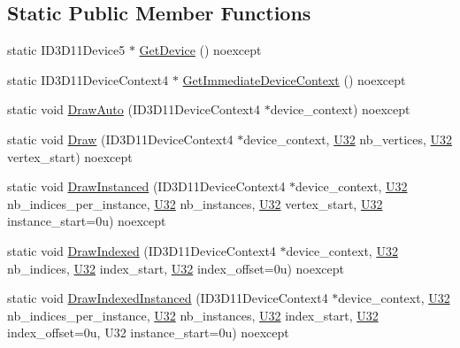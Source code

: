 \subsection*{Static Public Member Functions}
\begin{DoxyCompactItemize}
\item 
static I\+D3\+D11\+Device5 $\ast$ \hyperlink{structmage_1_1_pipeline_a106ef812d342b6f9afc52976eb67f136}{Get\+Device} () noexcept
\item 
static I\+D3\+D11\+Device\+Context4 $\ast$ \hyperlink{structmage_1_1_pipeline_a627116ca4b8d77277c5aae0b986eddeb}{Get\+Immediate\+Device\+Context} () noexcept
\item 
static void \hyperlink{structmage_1_1_pipeline_ae4c5c2f93213062df4ed5964182e06fe}{Draw\+Auto} (I\+D3\+D11\+Device\+Context4 $\ast$device\+\_\+context) noexcept
\item 
static void \hyperlink{structmage_1_1_pipeline_afbce120d43cbe47d1f69b2be40d1fd80}{Draw} (I\+D3\+D11\+Device\+Context4 $\ast$device\+\_\+context, \hyperlink{namespacemage_a41c104c036fba3756a74e19f793eeaa1}{U32} nb\+\_\+vertices, \hyperlink{namespacemage_a41c104c036fba3756a74e19f793eeaa1}{U32} vertex\+\_\+start) noexcept
\item 
static void \hyperlink{structmage_1_1_pipeline_a7a4006773adca9c29fdc3436280dd628}{Draw\+Instanced} (I\+D3\+D11\+Device\+Context4 $\ast$device\+\_\+context, \hyperlink{namespacemage_a41c104c036fba3756a74e19f793eeaa1}{U32} nb\+\_\+indices\+\_\+per\+\_\+instance, \hyperlink{namespacemage_a41c104c036fba3756a74e19f793eeaa1}{U32} nb\+\_\+instances, \hyperlink{namespacemage_a41c104c036fba3756a74e19f793eeaa1}{U32} vertex\+\_\+start, \hyperlink{namespacemage_a41c104c036fba3756a74e19f793eeaa1}{U32} instance\+\_\+start=0u) noexcept
\item 
static void \hyperlink{structmage_1_1_pipeline_acfb174bff4702075e1b4ea2111192616}{Draw\+Indexed} (I\+D3\+D11\+Device\+Context4 $\ast$device\+\_\+context, \hyperlink{namespacemage_a41c104c036fba3756a74e19f793eeaa1}{U32} nb\+\_\+indices, \hyperlink{namespacemage_a41c104c036fba3756a74e19f793eeaa1}{U32} index\+\_\+start, \hyperlink{namespacemage_a41c104c036fba3756a74e19f793eeaa1}{U32} index\+\_\+offset=0u) noexcept
\item 
static void \hyperlink{structmage_1_1_pipeline_a6e92a08ad63016d306dac8da092d3932}{Draw\+Indexed\+Instanced} (I\+D3\+D11\+Device\+Context4 $\ast$device\+\_\+context, \hyperlink{namespacemage_a41c104c036fba3756a74e19f793eeaa1}{U32} nb\+\_\+indices\+\_\+per\+\_\+instance, \hyperlink{namespacemage_a41c104c036fba3756a74e19f793eeaa1}{U32} nb\+\_\+instances, \hyperlink{namespacemage_a41c104c036fba3756a74e19f793eeaa1}{U32} index\+\_\+start, \hyperlink{namespacemage_a41c104c036fba3756a74e19f793eeaa1}{U32} index\+\_\+offset=0u, U32 instance\+\_\+start=0u) noexcept

\end{DoxyCompactItemize}
